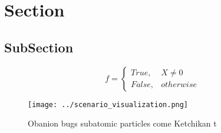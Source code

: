 \documentclass[a4paper]{article}
\begin{document}
\section{Section}

\subsection{SubSection}

\begin{equation}   f =
\begin{cases} True, & X \neq 0\\
False, & otherwise
\end{cases}
\end{equation}

\begin{figure}
\centering
\texttt{[image: ../scenario\_visualization.png]}
\caption{Obanion bugs subatomic particles come Ketchikan t
}
\end{figure}
 
\end{document}
